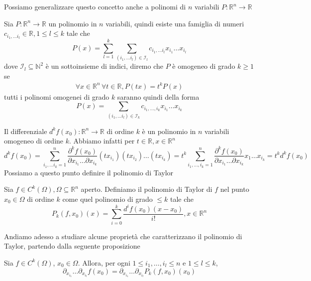 Possiamo generalizzare questo concetto anche a polinomi di $n$ variabili $P: \mathbb{R}^n \to \mathbb{R}$
\begin{definition}
Sia $P:\mathbb{R}^n \to \mathbb{R}$ un polinomio in $n$ variabili, quindi esiste una famiglia di numeri $c_{i_1, \ldots i_l} \in \mathbb{R}, 1 \leq l \leq k$ tale che
$$
P(x) = \sum_{l=1}^k \sum_{(i_1, \ldots i_l) \in \mathcal{I}_l} c_{i_1, \ldots i_l} x_{i_1} \ldots x_{i_l}
$$
dove $\mathcal{I}_l \subseteq \mathbb{N}^2$ è un sottoinsieme di indici, diremo che $P$ è omogeneo di grado $k \geq 1$ se
\begin{align*}
\forall x \in \mathbb{R}^n \, \forall t \in \mathbb{R}, P(tx) = t^k P(x)
\end{align*}
tutti i polinomi omogenei di grado $k$ saranno quindi della forma
$$
P(x) = \sum_{(i_1, \ldots i_l) \in \mathcal{I}_k} c_{i_1, \ldots, i_k} x_{i_1} \ldots x_{i_k}
$$
\end{definition}
Il differenziale $d^k f(x_0): \mathbb{R}^n \to \mathbb{R}$ di ordine $k$ è un polinomio in $n$ variabili omogeneo di ordine $k$. Abbiamo infatti per $t \in \mathbb{R}, x \in \mathbb{R}^n$
$$
d^k f(x_0) = \sum_{i_1, \ldots i_k = 1}^n \frac{\partial^k f(x_0)}{\partial x_{i_1} \ldots \partial x_{i_k}}(tx_{i_1})(tx_{i_2}) \ldots (tx_{i_k}) = t^k \sum_{i_1, \ldots, i_k = 1}^n \frac{\partial^k f(x_0)}{\partial x_{i_1} \ldots \partial x_{i_k}} x_1 \ldots x_{i_k} = t^k d^k f(x_0)
$$
Possiamo a questo punto definire il polinomio di Taylor
\begin{definition}
Sia $f \in C^{k}(\Omega), \Omega \subseteq \mathbb{R}^n$ aperto. Definiamo il polinomio di Taylor di $f$ nel punto $x_0 \in \Omega$ di ordine $k$ come quel polinomio di grado $\leq k$ tale che
$$
P_k(f, x_0)(x) = \sum_{i=0}^k \frac{d^i f(x_0)(x-x_0)}{i!}, x \in \mathbb{R}^n
$$
\end{definition}
Andiamo adesso a studiare alcune proprietà che caratterizzano il polinomio di Taylor, partendo dalla seguente proposizione
\begin{prop}
Sia $f \in C^k(\Omega)$, $x_0 \in \Omega$. Allora, per ogni $1 \leq i_1, \ldots, i_l \leq n$ e $1 \leq l \leq k$,
$$
\partial_{x_{i_1}} \ldots \partial_{x_{i_l}} f(x_0) = \partial_{x_{i_1}} \ldots \partial_{x_{i_l}} P_k(f, x_0)(x_0)
$$

\end{prop}
